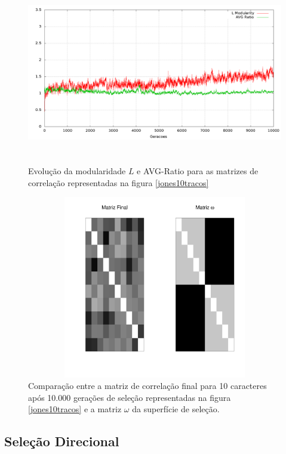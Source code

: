 \begin{figure}[htbp]
    \centering
    \includegraphics[width=150mm, height=80mm]{figuras/jones10tracosStats.png}
    \caption{Evolução da modularidade $L$ e AVG-Ratio para as matrizes de
    correlação representadas na figura \ref{jones10tracos}}
    \label{jones10tracosStats}
\end{figure}



\begin{figure}[htbp]
    \centering
    \includegraphics[width=150mm, height=80mm]{figuras/Mat10tracos}
    \caption{Comparação entre a matriz de correlação final para 10
        caracteres após 10.000 gerações de seleção representadas na figura
    \ref{jones10tracos} e a matriz $\omega$ da superfície de seleção.}
    \label{MatJones10tracos}
\end{figure}



\subsection{Seleção Direcional}

